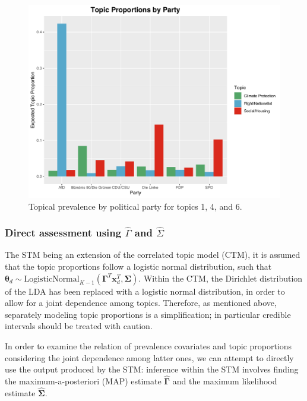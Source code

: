 \begin{figure}[h!]
  \centering
  \captionsetup{justification=centering,margin=2cm}
  \includegraphics[scale = 0.5]{../plots/5_1/quasi_t146_cat.pdf}
  \caption{Topical prevalence by political party for topics 1, 4, and 6.}
  \label{fig:quasi_t146_cat}
\end{figure}

\subsubsection{Direct assessment using $\hat{\Gamma}$ and $\hat{\Sigma}$}
\label{Direct assessment}

The STM being an extension of the correlated topic model (CTM), it is assumed that the topic proportions follow a logistic normal distribution, such that $\boldsymbol{\theta}_d \sim \text{LogisticNormal}_{K-1}(\boldsymbol{\Gamma}^T\boldsymbol{x}_d^T, \boldsymbol{\Sigma})$. Within the CTM, the Dirichlet distribution of the LDA has been replaced with a logistic normal distribution, in order to allow for a joint dependence among topics. Therefore, as mentioned above, separately modeling topic proportions is a simplification; in particular credible intervals should be treated with caution.

In order to examine the relation of prevalence covariates and topic proportions considering the joint dependence among latter ones, we can attempt to directly use the output produced by the STM: inference within the STM involves finding the maximum-a-posteriori (MAP) estimate $\hat{\boldsymbol{\Gamma}}$ and the maximum likelihood estimate $\hat{\boldsymbol{\Sigma}}$. 

